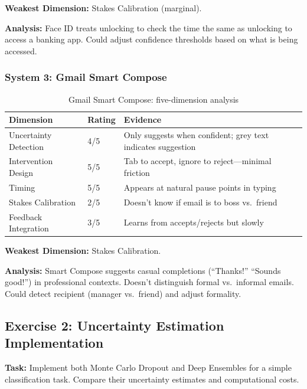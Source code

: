\textbf{Weakest Dimension:} Stakes Calibration (marginal).

\textbf{Analysis:} Face ID treats unlocking to check the time the same as unlocking to access a banking app. Could adjust confidence thresholds based on what is being accessed.

\subsubsection{System 3: Gmail Smart Compose}

\begin{table}[htbp]
\caption{Gmail Smart Compose: five-dimension analysis}
\label{tab:gmail-analysis}
\centering
\begin{tabular}{@{}p{3.5cm}p{1.5cm}p{7cm}@{}}
\toprule
\textbf{Dimension} & \textbf{Rating} & \textbf{Evidence} \\
\midrule
Uncertainty Detection & 4/5 & Only suggests when confident; grey text indicates suggestion \\
Intervention Design & 5/5 & Tab to accept, ignore to reject---minimal friction \\
Timing & 5/5 & Appears at natural pause points in typing \\
Stakes Calibration & 2/5 & Doesn't know if email is to boss vs.\ friend \\
Feedback Integration & 3/5 & Learns from accepts/rejects but slowly \\
\bottomrule
\end{tabular}
\end{table}

\textbf{Weakest Dimension:} Stakes Calibration.

\textbf{Analysis:} Smart Compose suggests casual completions (``Thanks!'' ``Sounds good!'') in professional contexts. Doesn't distinguish formal vs.\ informal emails. Could detect recipient (manager vs.\ friend) and adjust formality.

\subsection{Exercise 2: Uncertainty Estimation Implementation}

\textbf{Task:} Implement both Monte Carlo Dropout and Deep Ensembles for a simple classification task. Compare their uncertainty estimates and computational costs.

